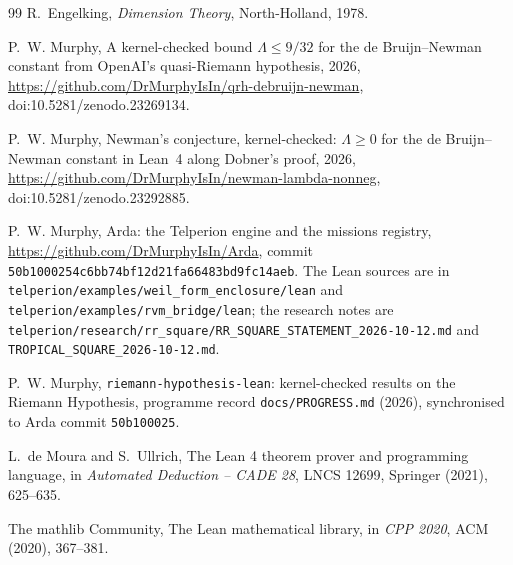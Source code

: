 \documentclass[11pt]{article}
\theoremstyle{definition}
\begin{document}
\begin{thebibliography}{99}
 R.~Engelking, \emph{Dimension Theory}, North-Holland, 1978.

 P.~W. Murphy, A kernel-checked bound $\Lambda \le 9/32$ for the de Bruijn--Newman constant from OpenAI's quasi-Riemann hypothesis, 2026, \url{https://github.com/DrMurphyIsIn/qrh-debruijn-newman}, doi:10.5281/zenodo.23269134.

 P.~W. Murphy, Newman's conjecture, kernel-checked: $\Lambda \ge 0$ for the de Bruijn--Newman constant in Lean~4 along Dobner's proof, 2026, \url{https://github.com/DrMurphyIsIn/newman-lambda-nonneg}, doi:10.5281/zenodo.23292885.

 P.~W. Murphy, Arda: the Telperion engine and the missions registry, \url{https://github.com/DrMurphyIsIn/Arda}, commit \texttt{50b1000254c6bb74bf12d21fa66483bd9fc14aeb}. The Lean sources are in \texttt{telperion/examples/weil\_form\_enclosure/lean} and \texttt{telperion/examples/rvm\_bridge/lean}; the research notes are \texttt{telperion/research/rr\_square/RR\_SQUARE\_STATEMENT\_2026-10-12.md} and \texttt{TROPICAL\_SQUARE\_2026-10-12.md}.

 P.~W. Murphy, \texttt{riemann-hypothesis-lean}: kernel-checked results on the Riemann Hypothesis, programme record \texttt{docs/PROGRESS.md} (2026), synchronised to Arda commit \texttt{50b100025}.

 L.~de Moura and S.~Ullrich, The Lean 4 theorem prover and programming language, in \emph{Automated Deduction -- CADE 28}, LNCS 12699, Springer (2021), 625--635.

 The mathlib Community, The Lean mathematical library, in \emph{CPP 2020}, ACM (2020), 367--381.

\end{thebibliography}
\end{document}
